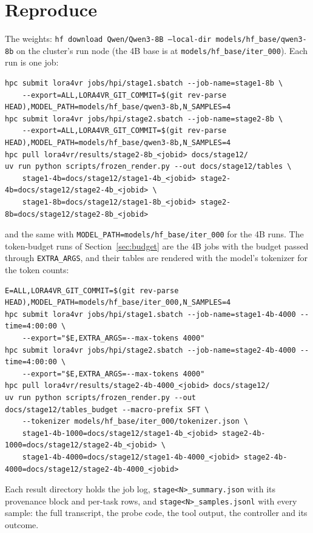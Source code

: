 \documentclass[11pt,a4paper]{article}
\begin{document}
\clearpage
\section{Reproduce}
\sloppy
The weights: \texttt{hf download Qwen/Qwen3-8B --local-dir
models/hf\_base/qwen3-8b} on the cluster's run node (the 4B base is at
\texttt{models/hf\_base/iter\_000}). Each run is one job:
\begin{scriptsize}
\begin{verbatim}
hpc submit lora4vr jobs/hpi/stage1.sbatch --job-name=stage1-8b \
    --export=ALL,LORA4VR_GIT_COMMIT=$(git rev-parse HEAD),MODEL_PATH=models/hf_base/qwen3-8b,N_SAMPLES=4
hpc submit lora4vr jobs/hpi/stage2.sbatch --job-name=stage2-8b \
    --export=ALL,LORA4VR_GIT_COMMIT=$(git rev-parse HEAD),MODEL_PATH=models/hf_base/qwen3-8b,N_SAMPLES=4
hpc pull lora4vr/results/stage2-8b_<jobid> docs/stage12/
uv run python scripts/frozen_render.py --out docs/stage12/tables \
    stage1-4b=docs/stage12/stage1-4b_<jobid> stage2-4b=docs/stage12/stage2-4b_<jobid> \
    stage1-8b=docs/stage12/stage1-8b_<jobid> stage2-8b=docs/stage12/stage2-8b_<jobid>
\end{verbatim}
\end{scriptsize}
and the same with \texttt{MODEL\_PATH=models/hf\_base/iter\_000} for the 4B
runs. The token-budget runs of Section~\ref{sec:budget} are the 4B jobs with
the budget passed through \texttt{EXTRA\_ARGS}, and their tables are
rendered with the model's tokenizer for the token counts:
\begin{scriptsize}
\begin{verbatim}
E=ALL,LORA4VR_GIT_COMMIT=$(git rev-parse HEAD),MODEL_PATH=models/hf_base/iter_000,N_SAMPLES=4
hpc submit lora4vr jobs/hpi/stage1.sbatch --job-name=stage1-4b-4000 --time=4:00:00 \
    --export="$E,EXTRA_ARGS=--max-tokens 4000"
hpc submit lora4vr jobs/hpi/stage2.sbatch --job-name=stage2-4b-4000 --time=4:00:00 \
    --export="$E,EXTRA_ARGS=--max-tokens 4000"
hpc pull lora4vr/results/stage2-4b-4000_<jobid> docs/stage12/
uv run python scripts/frozen_render.py --out docs/stage12/tables_budget --macro-prefix SFT \
    --tokenizer models/hf_base/iter_000/tokenizer.json \
    stage1-4b-1000=docs/stage12/stage1-4b_<jobid> stage2-4b-1000=docs/stage12/stage2-4b_<jobid> \
    stage1-4b-4000=docs/stage12/stage1-4b-4000_<jobid> stage2-4b-4000=docs/stage12/stage2-4b-4000_<jobid>
\end{verbatim}
\end{scriptsize} Each result directory holds the job log, \texttt{stage<N>\_summary.json}
with its provenance block and per-task rows, and
\texttt{stage<N>\_samples.jsonl} with every sample: the full transcript, the
probe code, the tool output, the controller and its outcome.
\fussy
\end{document}
